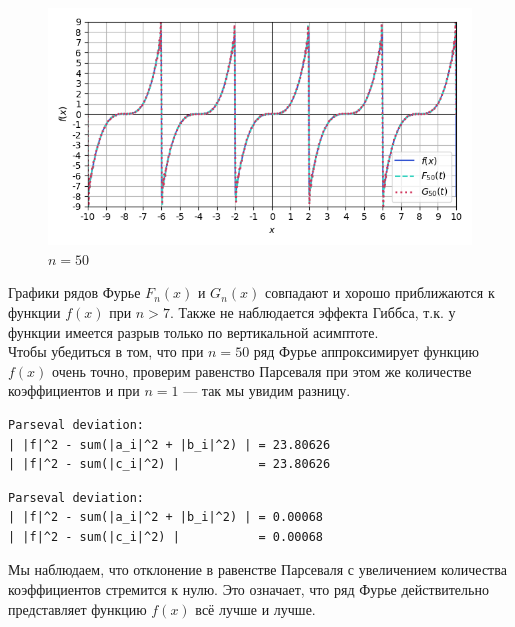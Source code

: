 \documentclass[a4paper]{article}
\begin{document}
\begin{figure}[H]
\begin{minipage}{0.5\textwidth}
        \caption{$n = 11$}
    \end{minipage}
    \begin{minipage}{0.5\textwidth}
        \centering \includegraphics[width=\textwidth]{odd_func/50.png}
        \caption{$n = 50$}
    \end{minipage}
\end{figure}\noindent
Графики рядов Фурье $F_n(x)$ и $G_n(x)$ совпадают и хорошо приближаются к функции $f(x)$ при $n > 7$. Также не наблюдается эффекта Гиббса, т.к. у функции имеется разрыв только по вертикальной асимптоте.\\[0.5em]
Чтобы убедиться в том, что при $n = 50$ ряд Фурье аппроксимирует функцию $f(x)$ очень точно, проверим равенство Парсеваля при этом же количестве коэффициентов и при $n = 1$ --- так мы увидим разницу.\\
\begin{minipage}{0.48\textwidth}
\begin{lstlisting}[caption={Равенство Парасеваля при $n=1$}]
Parseval deviation:
| |f|^2 - sum(|a_i|^2 + |b_i|^2) | = 23.80626
| |f|^2 - sum(|c_i|^2) |           = 23.80626
\end{lstlisting}
\end{minipage}\hfill
\begin{minipage}{0.49\textwidth}
\begin{lstlisting}[caption={Равенство Парасеваля при $n=50$}, numbers=none]
Parseval deviation:
| |f|^2 - sum(|a_i|^2 + |b_i|^2) | = 0.00068
| |f|^2 - sum(|c_i|^2) |           = 0.00068
\end{lstlisting}
\end{minipage}
Мы  наблюдаем, что отклонение в равенстве Парсеваля с увеличением количества коэффициентов стремится к нулю. Это означает, что ряд Фурье действительно представляет функцию $f(x)$ всё лучше и лучше.\newpage
\end{document}
